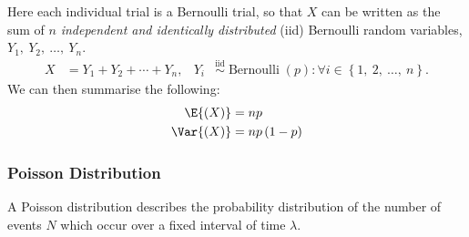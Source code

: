 \documentclass{article}
\begin{document}
Here each individual trial is a Bernoulli trial, so that \(X\) can be written as the sum of
\(n\) \textit{independent and identically distributed} (iid) Bernoulli random variables, \(Y_1,\: Y_2,\: \dots,\: Y_n\).
\begin{align*}
    X & = Y_1 + Y_2 + \cdots + Y_n, & Y_i & \overset{\mathrm{iid}}{\sim} \operatorname{Bernoulli}{\left( p \right)} : \forall i \in \left\{ 1,\: 2,\: \dots,\: n \right\}.
\end{align*}
We can then summarise the following:
\begin{align*}
    \E{\left( X \right)}   & = np                      \\
    \Var{\left( X \right)} & = np \left( 1 - p \right)
\end{align*}
\subsubsection{Poisson Distribution}
A Poisson distribution describes the probability distribution of the number of events \(N\) which occur over a fixed interval of time \(\lambda\).
\end{document}
